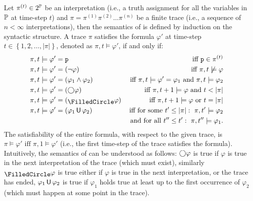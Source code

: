 Let $\pi^{(t)} \in 2^{\mathbb{P}}$ be an interpretation (i.e., a truth assignment for all the variables in ${\mathbb{P}}$ at time-step $t$) and $\pi = \pi^{(1)}\pi^{(2)}\dots\pi^{(n)}$ be a finite trace (i.e., a sequence of $n < \infty$ interpretations), then the semantics of \LTLf is defined by induction on the syntactic structure. A trace $\pi$ satisfies the formula $\varphi'$ at time-step $t \in \left\{1, 2, \dots, |\pi|\right\}$, denoted as $\pi, t \models \varphi'$, if and only if:
\begin{align*}
	\pi, t &\models \varphi' = \texttt{p} &\text{iff } \texttt{p} \in \pi^{(t)}\\
	\pi, t &\models \varphi' = (\neg \varphi) &\text{iff } \pi, t \not\models \varphi\\
	\pi, t &\models \varphi' = (\varphi_1 \wedge \varphi_2) &\text{iff } \pi, t \models \varphi' = \varphi_1\text{ and } \pi, t \models \varphi_2 \\
	\pi, t &\models \varphi' = (\ltlnext \varphi) &\text{iff } \pi, t + 1 \models \varphi \text{ and } t < |\pi| \\
	\pi, t &\models \varphi' = (\ltlweaknext \varphi) &\text{iff } \pi, t + 1 \models \varphi \ \text{or} \ t = |\pi| \\
	\pi, t &\models \varphi' = (\varphi_1 \ltluntil \varphi_2) &\text{iff for some } t' \leq |\pi|:\ \pi, t' \models \varphi_2 \\ &&\ \text{and for all } t'' \leq t': \ \pi, t'' \models \varphi_1.
\end{align*}
The satisfiability of the entire formula, with respect to the given trace, is $\pi \models \varphi' \text{ iff } \pi, 1 \models \varphi'$ (i.e., the first time-step of the trace satisfies the formula). Intuitively, the semantics of \LTLf can be understood as follows: $\bigcirc \varphi$ is true if $\varphi$ is true in the next interpretation of the trace (which must exist), similarly $\ltlweaknext \varphi$ is true either if $\varphi$ is true in the next interpretation, or the trace has ended, $\varphi_1 \,\mathsf{U}\, \varphi_2$ is true if $\varphi_1$ holds true at least up to the first occurrence of $\varphi_2$ (which must happen at some point in the trace).

